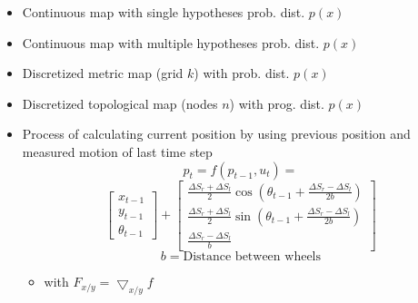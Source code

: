 \begin{itemize}
\begin{itemize}
                \begin{itemize}
                    \item Continuous map with single hypotheses prob. dist. $p(x)$
                    \item Continuous map with multiple hypotheses prob. dist. $p(x)$
                    \item Discretized metric map (grid $k$) with prob. dist. $p(x)$
                    \item Discretized topological map (nodes $n$) with prog. dist. $p(x)$
                \end{itemize}
        \end{itemize}
        \begin{itemize}
            \item Process of calculating current position by using previous position and measured motion of last time step
             
\[
    p_t = f(p_{t - 1}, u_t) =
\]
\[
    \begin{bmatrix}
        x_{t - 1}\\
        y_{t - 1}\\
        \theta_{t - 1}
    \end{bmatrix} +
    \begin{bmatrix}
        \frac{\Delta S_r + \Delta S_l}{2} \cos(\theta_{t - 1} + \frac{\Delta S_r - \Delta S_l}{2b})\\
        \frac{\Delta S_r + \Delta S_l}{2} \sin(\theta_{t - 1} + \frac{\Delta S_r - \Delta S_l}{2b})\\
        \frac{\Delta S_r - \Delta S_l}{b}
    \end{bmatrix}
\]
\[
b = \text{Distance between wheels}
\]
                \begin{itemize}
                     $\Sigma_{p_t} = F_{p_{t-1}} \Sigma_{p_{t-1}} F_{p_{t-1}}^\transpose + F_{\Delta S} \Sigma_{\Delta S} F_{\Delta S}^\transpose$
                     $\Sigma_{\Delta S} =
                        \begin{pmatrix}
                            k_r |\Delta S_r | & 0\\
                            0 & k_l |\Delta S_l|
                        \end{pmatrix}$
                    \item with $F_{x/y} = \bigtriangledown_{x/y} f$
                \end{itemize}
        \end{itemize}
\end{itemize}

